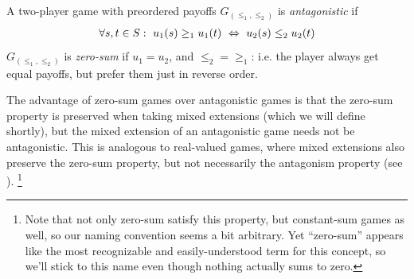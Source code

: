 \documentclass[a4paper]{scrreprt}
\begin{document}
    \begin{defn}
        A two-player game with preordered payoffs $G_{(\leq_1, \leq_2)}$ is \emph{antagonistic} if
        \begin{gather*}
            \forall s, t \in S:~ u_1(s) \geq_1 u_1(t) ~\Leftrightarrow~ u_2(s) \leq_2 u_2(t)
        \end{gather*}
        $G_{(\leq_1, \leq_2)}$ is \emph{zero-sum} if $u_1 = u_2$, and $\leq_2 {=} \geq_1$: i.e. the player always get equal payoffs, but prefer them just in reverse order.
        \label{def:zeroSumPreorderedPayoffs}
    \end{defn}
    
    The advantage of zero-sum games over antagonistic games is that the zero-sum property is preserved when taking mixed extensions (which we will define shortly), but the mixed extension of an antagonistic game needs not be antagonistic. 
    This is analogous to real-valued games, where mixed extensions also preserve the zero-sum property, but not necessarily the antagonism property (see \cite{bib:andersonAntagonisticGames}).
    \footnote{Note that not only zero-sum satisfy this property, but constant-sum games as well, so our naming convention seems a bit arbitrary.
        Yet “zero-sum” appears like the most recognizable and easily-understood term for this concept, so we'll stick to this name even though nothing actually sums to zero.}
    
\end{document}

